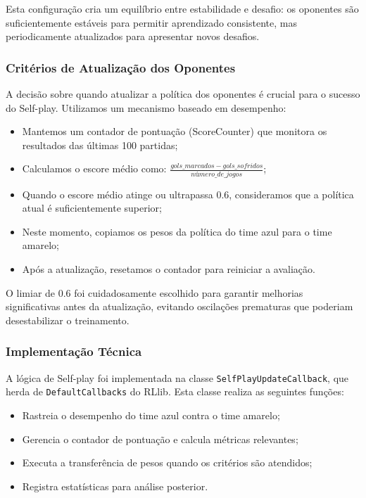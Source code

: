 Esta configuração cria um equilíbrio entre estabilidade e desafio: os oponentes são suficientemente estáveis para permitir aprendizado consistente, mas periodicamente atualizados para apresentar novos desafios.

\subsubsection{Critérios de Atualização dos Oponentes}

A decisão sobre quando atualizar a política dos oponentes é crucial para o sucesso do Self-play. Utilizamos um mecanismo baseado em desempenho:

\begin{itemize}
    \item Mantemos um contador de pontuação (ScoreCounter) que monitora os resultados das últimas 100 partidas;
    \item Calculamos o escore médio como: $\frac{gols\_marcados - gols\_sofridos}{número\_de\_jogos}$;
    \item Quando o escore médio atinge ou ultrapassa 0.6, consideramos que a política atual é suficientemente superior;
    \item Neste momento, copiamos os pesos da política do time azul para o time amarelo;
    \item Após a atualização, resetamos o contador para reiniciar a avaliação.
\end{itemize}

O limiar de 0.6 foi cuidadosamente escolhido para garantir melhorias significativas antes da atualização, evitando oscilações prematuras que poderiam desestabilizar o treinamento.

\subsubsection{Implementação Técnica}

A lógica de Self-play foi implementada na classe \texttt{SelfPlayUpdateCallback}, que herda de \texttt{DefaultCallbacks} do RLlib. Esta classe realiza as seguintes funções:

\begin{itemize}
    \item Rastreia o desempenho do time azul contra o time amarelo;
    \item Gerencia o contador de pontuação e calcula métricas relevantes;
    \item Executa a transferência de pesos quando os critérios são atendidos;
    \item Registra estatísticas para análise posterior.
\end{itemize}

